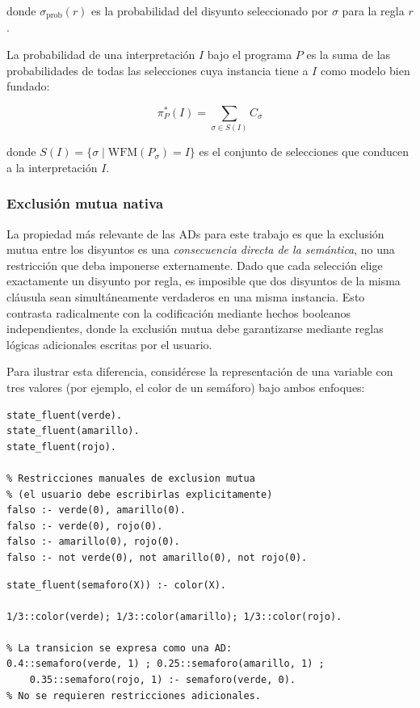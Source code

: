 donde $\sigma_{\text{prob}}(r)$ es la probabilidad del disyunto seleccionado por $\sigma$ para la regla $r$.

La probabilidad de una interpretación $I$ bajo el programa $P$ es la suma de las probabilidades de todas las selecciones cuya instancia tiene a $I$ como modelo bien fundado:

\begin{equation}
    \pi^*_P(I) = \sum_{\sigma \in S(I)} C_\sigma
    \label{eq:interpretation-probability}
\end{equation}

donde $S(I) = \{\sigma \mid \text{WFM}(P_\sigma) = I\}$ es el conjunto de selecciones que conducen a la interpretación $I$.

\subsubsection{Exclusión mutua nativa}

La propiedad más relevante de las ADs para este trabajo es que la exclusión mutua entre los disyuntos es una \textit{consecuencia directa de la semántica}, no una restricción que deba imponerse externamente. Dado que cada selección elige exactamente un disyunto por regla, es imposible que dos disyuntos de la misma cláusula sean simultáneamente verdaderos en una misma instancia. Esto contrasta radicalmente con la codificación mediante hechos booleanos independientes, donde la exclusión mutua debe garantizarse mediante reglas lógicas adicionales escritas por el usuario.

Para ilustrar esta diferencia, considérese la representación de una variable con tres valores (por ejemplo, el color de un semáforo) bajo ambos enfoques:

\begin{lstlisting}[caption={Codificación booleana (MDP-ProbLog original).}]
% Tres fluentes booleanos independientes
state_fluent(verde).
state_fluent(amarillo).
state_fluent(rojo).

% Restricciones manuales de exclusion mutua
% (el usuario debe escribirlas explicitamente)
falso :- verde(0), amarillo(0).
falso :- verde(0), rojo(0).
falso :- amarillo(0), rojo(0).
falso :- not verde(0), not amarillo(0), not rojo(0).
\end{lstlisting}

\begin{lstlisting}[caption={Codificación con Disyunciones Anotadas (extensión propuesta).}]
% Un unico fluente multivaluado con exclusion mutua nativa
state_fluent(semaforo(X)) :- color(X).

1/3::color(verde); 1/3::color(amarillo); 1/3::color(rojo).

% La transicion se expresa como una AD:
0.4::semaforo(verde, 1) ; 0.25::semaforo(amarillo, 1) ;
    0.35::semaforo(rojo, 1) :- semaforo(verde, 0).
% No se requieren restricciones adicionales.
\end{lstlisting}

